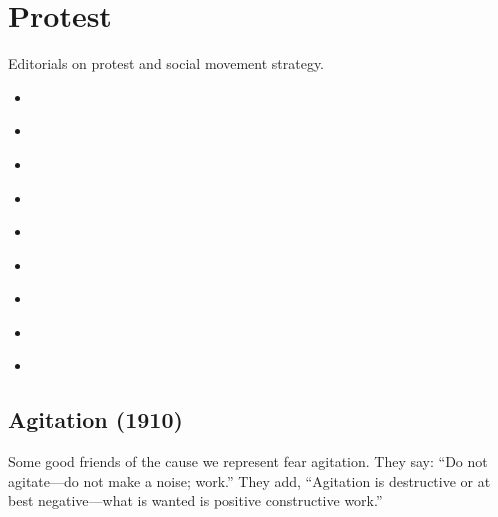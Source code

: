 \documentclass[letterpaper,10pt,english]{jupyterBook}
\begin{document}
\section{Protest}
\label{\detokenize{Sections/protest:protest}}\label{\detokenize{Sections/protest::doc}}
\sphinxAtStartPar
Editorials on protest and social movement strategy.
\begin{itemize}
\item {} 
\sphinxAtStartPar
{\hyperref[\detokenize{Volumes/01/01/Agitation::doc}]{}}

\item {} 
\sphinxAtStartPar
{\hyperref[\detokenize{Volumes/05/05/proper_way::doc}]{}}

\item {} 
\sphinxAtStartPar
{\hyperref[\detokenize{Volumes/16/03/close_ranks::doc}]{}}

\item {} 
\sphinxAtStartPar
{\hyperref[\detokenize{Volumes/19/01/statement::doc}]{}}

\item {} 
\sphinxAtStartPar
{\hyperref[\detokenize{Volumes/12/06/negro_party::doc}]{}}

\item {} 
\sphinxAtStartPar
{\hyperref[\detokenize{Volumes/22/01/inter-racial_comity::doc}]{}}

\item {} 
\sphinxAtStartPar
{\hyperref[\detokenize{Volumes/24/01/publicity::doc}]{}}

\item {} 
\sphinxAtStartPar
{\hyperref[\detokenize{Volumes/41/05/violence::doc}]{}}

\item {} 
\sphinxAtStartPar
{\hyperref[\detokenize{Volumes/41/06/counsels_of_despair::doc}]{}}

\end{itemize}


\subsection{Agitation (1910)}
\label{\detokenize{Volumes/01/01/Agitation:agitation-1910}}\label{\detokenize{Volumes/01/01/Agitation::doc}}
\sphinxAtStartPar
Some good friends of the cause we represent fear agitation. They say: “Do not agitate—do not make a noise; work.” They add, “Agitation is destructive or at best negative—what is wanted is positive constructive work.”
\end{document}

